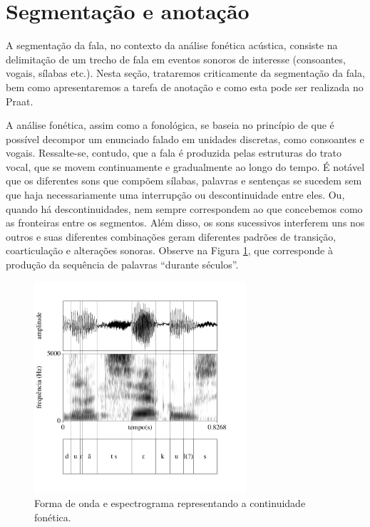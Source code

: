 \documentclass[portuguese]{textolivre}
\begin{document}
\section{Segmentação e anotação}\label{sec-segmentacao}
A segmentação da fala, no contexto da análise fonética acústica, consiste na delimitação de um trecho de fala em eventos sonoros de interesse (consoantes, vogais, sílabas etc.). Nesta seção, trataremos criticamente da segmentação da fala, bem como apresentaremos a tarefa de anotação e como esta pode ser realizada no Praat.
 
A análise fonética, assim como a fonológica, se baseia no princípio de que é possível decompor um enunciado falado em unidades discretas, como consoantes e vogais. Ressalte-se, contudo, que a fala é produzida pelas estruturas do trato vocal, que se movem continuamente e gradualmente ao longo do tempo. É notável que os diferentes sons que compõem sílabas, palavras e sentenças se sucedem sem que haja necessariamente uma interrupção ou descontinuidade entre eles. Ou, quando há descontinuidades, nem sempre correspondem ao que concebemos como as fronteiras entre os segmentos. Além disso, os sons sucessivos interferem uns nos outros e suas diferentes combinações geram diferentes padrões de transição, coarticulação e alterações sonoras. Observe na Figura \ref{fig9}, que corresponde à produção da sequência de palavras  ``durante séculos''. 

\begin{figure}[htbp]
 \centering
 \includegraphics[width=0.7\textwidth]{Fig9.pdf}
 \caption{Forma de onda e espectrograma representando a continuidade fonética.}
 \label{fig9}
\end{figure}
\end{document}
